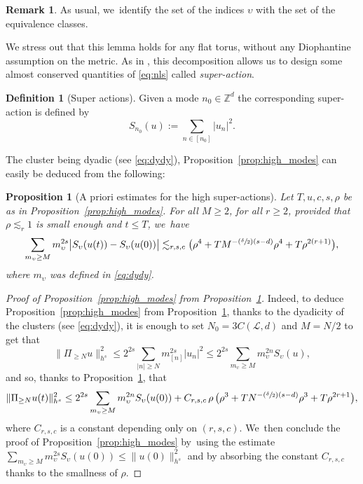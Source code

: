 \documentclass[10pt,a4paper]{amsart}
\newcommand{\Psfrac}[2]{(\sfrac{#1}{#2})}
\theoremstyle{plain}
\newtheorem{proposition}[theorem]{Proposition}
\theoremstyle{definition}
\newtheorem{definition}[theorem]{Definition}
\newtheorem{remark}[theorem]{Remark}
\newcommand{\1}{\mathbf{1}}
\begin{document}
\begin{remark}
As usual, we~identify the set of the indices $\upsilon$ with the set of the equivalence classes.
\end{remark}

We stress out that this lemma holds for any flat torus, without any Diophantine assumption on the metric. As in \cite{BFM22}, this decomposition allows us to design some almost conserved quantities of \eqref{eq:nls} called \emph{super-action}.

\begin{definition}[Super actions] \label{def:super_actions} Given a mode $n_0\in \mathbb{Z}^d$ the corresponding super-action is defined by
\[
S_{n_0}(u) := \sum_{n\in[n_{0}]} |u_n|^2.
\]
\end{definition}

The cluster being dyadic (see \eqref{eq:dydy}), Proposition~\ref{prop:high_modes} can easily be deduced from the following:
\begin{proposition}[A priori estimates for the high super-actions]\label{prop:ap-hi} Let $T,u,c,s,\rho$ be as in Proposition~\ref{prop:high_modes}. For all $M \geq 2$,
for all $r\geq2$, provided that $\rho\lesssim_r 1$ is small enough and $t\leq T$, we~have
\begin{equation}
\label{eq:ap-hi}
\sum_{m_\upsilon \geq M} m_\upsilon^{2s} \big|S_{\upsilon}(u(t))-S_{\upsilon}(u(0))\big|
\lesssim_{r,s,c} \bigl(\rho^4 + TM^{-\Psfrac{\delta}{2}(s-d)} \rho^{4}+T \rho^{2(r+1)}\bigr),
\end{equation}
where $m_{\upsilon}$ was defined in \eqref{eq:dydy}.
\end{proposition}

\begin{proof}[Proof of Proposition~\ref{prop:high_modes} from Proposition~\ref{prop:ap-hi}] Indeed, to deduce Proposition~\ref{prop:high_modes} from Proposition~\ref{prop:ap-hi}, thanks to the dyadicity of the clusters (see \eqref{eq:dydy}), it is enough to set $N_0 = 3C(\mathscr{L},d)$ and $M=N/2$ to get that
\[
\| \Pi_{\geq N} u \|_{h^s}^2 \leq 2^{2s} \sum_{|n|\geq N} m_{[n]}^{2s} |u_n|^2 \leq 2^{2s} \sum_{ m_\upsilon \geq M} m_\upsilon^{2n} S_\upsilon(u),
\]
and so, thanks to Proposition~\ref{prop:ap-hi}, that
\[
\| \Pi_{\geq N} u(t) \|_{h^s}^2 \leq 2^{2s} \sum_{ m_\upsilon \geq M} m_\upsilon^{2n} S_\upsilon(u(0)) + C_{r,s,c} \, \rho \, \bigl(\rho^3 + TN^{-\Psfrac{\delta}{2}(s-d)} \rho^{3}+T \rho^{2r+1}\bigr),
\]
where $C_{r,s,c}$ is a constant depending only on $(r,s,c)$. We~then conclude the proof of Proposition~\ref{prop:high_modes} by~using the estimate $\sum_{ m_\upsilon \geq M} m_\upsilon^{2s} S_\upsilon(u(0)) \leq \|u(0) \|_{h^s}^2$ and by absorbing the constant $C_{r,s,c} $ thanks to the smallness of $\rho$.
\end{proof}
\end{document}
